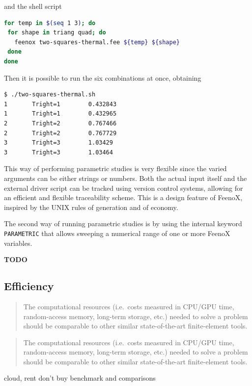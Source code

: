 \documentclass[
  american,
]{article}
\begin{document}
\noindent and the shell script

\begin{lstlisting}[language=bash, style={bash.sh}]
for temp in $(seq 1 3); do
 for shape in triang quad; do
   feenox two-squares-thermal.fee ${temp} ${shape}
 done
done
\end{lstlisting}

Then it is possible to run the six combinations at once, obtaining

\begin{lstlisting}
$ ./two-squares-thermal.sh
1       Tright=1        0.432843
1       Tright=1        0.432965
2       Tright=2        0.767466
2       Tright=2        0.767729
3       Tright=3        1.03429
3       Tright=3        1.03464
\end{lstlisting}

This way of performing parametric studies is very flexible since the
varied arguments can be either strings or numbers. Both the actual input
itself and the external driver script can be tracked using version
control systems, allowing for an efficient and flexible traceability
scheme. This is a design feature of FeenoX, inspired by the UNIX rules
of generation and of economy.

The second way of running parametric studies is by using the internal
keyword \passthrough{\lstinline!PARAMETRIC!} that allows sweeping a
numerical range of one or more FeenoX variables.

\textbf{TODO}

\hypertarget{sec:efficiency}{%
\subsection{Efficiency}\label{sec:efficiency}}

\begin{quote}
The computational resources (i.e.~costs measured in CPU/GPU time,
random-access memory, long-term storage, etc.) needed to solve a problem
should be comparable to other similar state-of-the-art finite-element
tools.
\end{quote}

\begin{quote}
The computational resources (i.e.~costs measured in CPU/GPU time,
random-access memory, long-term storage, etc.) needed to solve a problem
should be comparable to other similar state-of-the-art finite-element
tools.
\end{quote}

cloud, rent don't buy benchmark and comparisons
\end{document}
